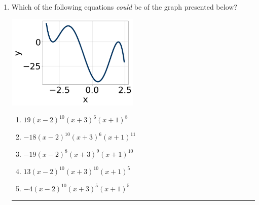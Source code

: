 \documentclass[14pt]{extbook}
\newcommand{\litem}[1]{\item#1\hspace*{-1cm}\rule{\textwidth}{0.4pt}}
\begin{document}
\begin{enumerate}
\litem{
Which of the following equations \textit{could} be of the graph presented below?
\begin{center}
    \includegraphics[width=0.5\textwidth]{../Figures/polyGraphToFunctionC.png}
\end{center}
\begin{enumerate}[label=\Alph*.]
\item \( 19(x - 2)^{10} (x + 3)^{6} (x + 1)^{8} \)
\item \( -18(x - 2)^{10} (x + 3)^{6} (x + 1)^{11} \)
\item \( -19(x - 2)^{8} (x + 3)^{9} (x + 1)^{10} \)
\item \( 13(x - 2)^{10} (x + 3)^{10} (x + 1)^{5} \)
\item \( -4(x - 2)^{10} (x + 3)^{5} (x + 1)^{5} \)


\end{enumerate}}
\end{enumerate}
\end{document}
